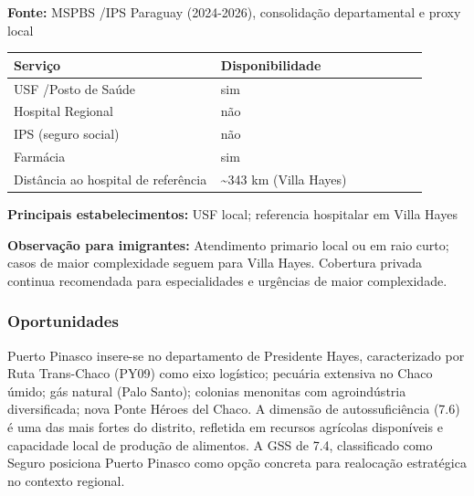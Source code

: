 \textbf{Fonte:} MSPBS /\allowbreak  IPS Paraguay (2024-2026), consolidação
departamental e proxy local

{\def\LTcaptype{none} %
\begin{longtable}{@{}>{\raggedright\arraybackslash}p{0.45\linewidth} >{\raggedright\arraybackslash}p{0.45\linewidth}@{}}
\toprule\noalign{}
Serviço & Disponibilidade \\
\midrule\noalign{}
\endhead
\bottomrule\noalign{}
\endlastfoot
USF /\allowbreak  Posto de Saúde & sim \\
Hospital Regional & não \\
IPS (seguro social) & não \\
Farmácia & sim \\
Distância ao hospital de referência & \textasciitilde343 km (Villa
Hayes) \\
\end{longtable}
}

\textbf{Principais estabelecimentos:} USF local; referencia hospitalar
em Villa Hayes

\textbf{Observação para imigrantes:} Atendimento primario local ou em
raio curto; casos de maior complexidade seguem para Villa Hayes.
Cobertura privada continua recomendada para especialidades e urgências
de maior complexidade.
\newpage

\subsubsection*{Oportunidades}\label{oport-puerto-pinasco-1503}
Puerto Pinasco insere-se no departamento de Presidente Hayes, caracterizado por Ruta Trans-Chaco (PY09) como eixo logístico; pecuária extensiva no Chaco úmido; gás natural (Palo Santo); colonias menonitas com agroindústria diversificada; nova Ponte Héroes del Chaco. A dimensão de autossuficiência (7.6) é uma das mais fortes do distrito, refletida em recursos agrícolas disponíveis e capacidade local de produção de alimentos. A GSS de 7.4, classificado como Seguro posiciona Puerto Pinasco como opção concreta para realocação estratégica no contexto regional.

